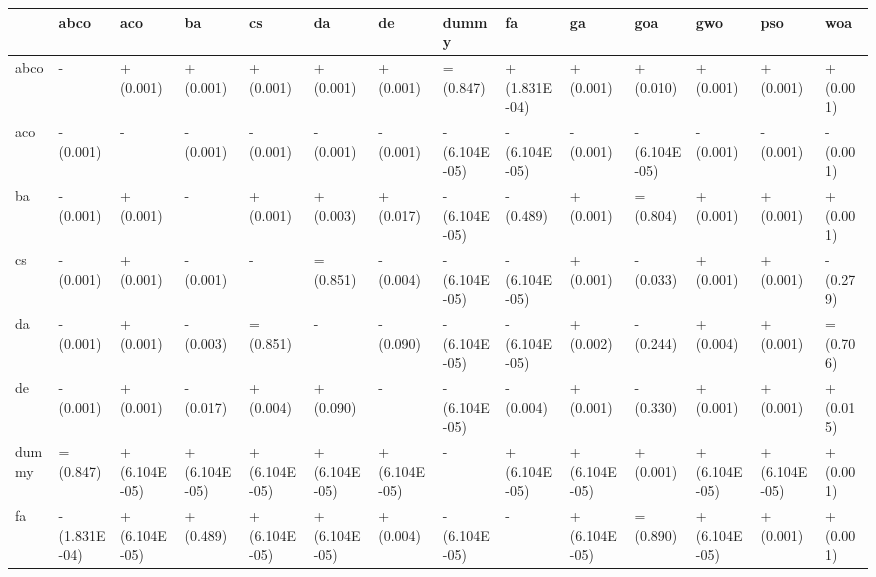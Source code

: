 \begin{table}
    \centering
    \begin{adjustbox}{width=\linewidth}
        \begin{tabular}{llllllllllllll}
            \toprule
            {}    & abco          & aco           & ba            & cs            & da            & de            & dummy         & fa            & ga            & goa           & gwo           & pso           & woa       \\
            \midrule
            abco  & -             & + (0.001)     & + (0.001)     & + (0.001)     & + (0.001)     & + (0.001)     & = (0.847)     & + (1.831E-04) & + (0.001)     & + (0.010)     & + (0.001)     & + (0.001)     & + (0.001) \\
            aco   & - (0.001)     & -             & - (0.001)     & - (0.001)     & - (0.001)     & - (0.001)     & - (6.104E-05) & - (6.104E-05) & - (0.001)     & - (6.104E-05) & - (0.001)     & - (0.001)     & - (0.001) \\
            ba    & - (0.001)     & + (0.001)     & -             & + (0.001)     & + (0.003)     & + (0.017)     & - (6.104E-05) & - (0.489)     & + (0.001)     & = (0.804)     & + (0.001)     & + (0.001)     & + (0.001) \\
            cs    & - (0.001)     & + (0.001)     & - (0.001)     & -             & = (0.851)     & - (0.004)     & - (6.104E-05) & - (6.104E-05) & + (0.001)     & - (0.033)     & + (0.001)     & + (0.001)     & - (0.279) \\
            da    & - (0.001)     & + (0.001)     & - (0.003)     & = (0.851)     & -             & - (0.090)     & - (6.104E-05) & - (6.104E-05) & + (0.002)     & - (0.244)     & + (0.004)     & + (0.001)     & = (0.706) \\
            de    & - (0.001)     & + (0.001)     & - (0.017)     & + (0.004)     & + (0.090)     & -             & - (6.104E-05) & - (0.004)     & + (0.001)     & - (0.330)     & + (0.001)     & + (0.001)     & + (0.015) \\
            dummy & = (0.847)     & + (6.104E-05) & + (6.104E-05) & + (6.104E-05) & + (6.104E-05) & + (6.104E-05) & -             & + (6.104E-05) & + (6.104E-05) & + (0.001)     & + (6.104E-05) & + (6.104E-05) & + (0.001) \\
            fa    & - (1.831E-04) & + (6.104E-05) & + (0.489)     & + (6.104E-05) & + (6.104E-05) & + (0.004)     & - (6.104E-05) & -             & + (6.104E-05) & = (0.890)     & + (6.104E-05) & + (0.001)     & + (0.001) \\

\end{tabular}
\end{adjustbox}
\end{table}
